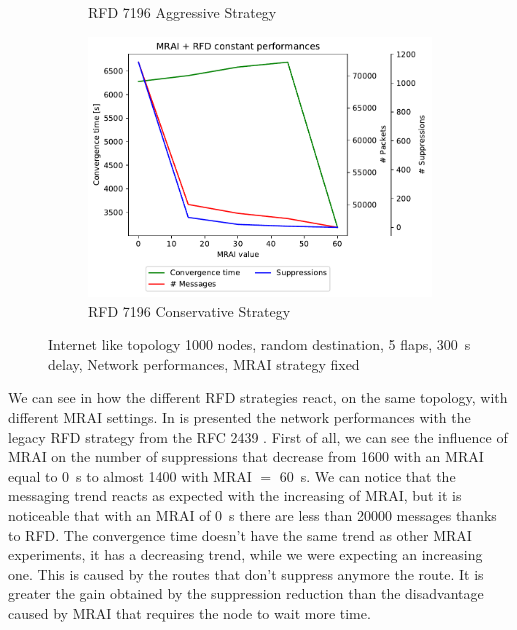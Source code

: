 \begin{figure}[h]
\begin{subfigure}[b]{0.325\textwidth}
         \caption{RFD 7196 Aggressive Strategy}
         \label{fig:1000_7196RFDA_multiMRAI_mice}
     \end{subfigure}
     \hfill
     \begin{subfigure}[b]{0.325\textwidth}
         \centering
         \includegraphics[width=\textwidth]{images/RFD/miceVSelephants/MultiMRAI/mice/cisco_1000_RFD_7196_conservative-constant_mrai_rfd_evolution.pdf}
         \caption{RFD 7196 Conservative Strategy}
         \label{fig:1000_7196RFDC_multiMRAI_mice}
     \end{subfigure}
		\caption{Internet like topology \num{1000} nodes, random destination,
		\num{5} flaps, \SI{300}{\second} delay, Network performances, \ac{MRAI}
		strategy fixed}
        \label{fig:1000_RFD_multiMRAI_mice}
\end{figure}


We can see in  how the different \ac{RFD} strategies
react, on the same topology, with different \ac{MRAI} settings.
In  is presented the network performances
with the legacy \ac{RFD} strategy from the \ac{RFC} \num{2439} \cite{rfc2439}.
First of all, we can see the influence of \ac{MRAI} on the number of suppressions
that decrease from \num{1600} with an \ac{MRAI} equal to \SI{0}{\second} to almost
\num{1400} with \ac{MRAI} $=$ \SI{60}{\second}.
We can notice that the messaging trend reacts as expected with the increasing of
\ac{MRAI}, but it is noticeable that with an \ac{MRAI} of \SI{0}{\second} there
are less than \num{20000} messages thanks to \ac{RFD}.
The convergence time doesn't have the same trend as other \ac{MRAI} experiments,
it has a decreasing trend, while we were expecting an increasing one.
This is caused by the routes that don't suppress anymore the route.
It is greater the gain obtained by the suppression reduction than the disadvantage
caused by \ac{MRAI} that requires the node to wait more time.

